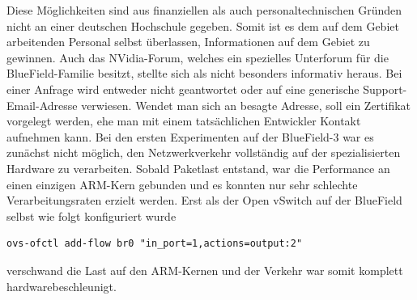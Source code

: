 Diese Möglichkeiten sind aus finanziellen als auch personaltechnischen Gründen nicht an einer deutschen Hochschule gegeben. Somit ist es dem auf dem Gebiet arbeitenden Personal selbst überlassen, Informationen auf dem Gebiet zu gewinnen. Auch das NVidia-Forum, welches ein spezielles Unterforum für die BlueField-Familie besitzt, stellte sich als nicht besonders informativ heraus. Bei einer Anfrage wird entweder nicht geantwortet oder auf eine generische Support-Email-Adresse verwiesen. Wendet man sich an besagte Adresse, soll ein Zertifikat vorgelegt werden, ehe man mit einem tatsächlichen Entwickler Kontakt aufnehmen kann.\newline
Bei den ersten Experimenten auf der BlueField-3 war es zunächst nicht möglich, den Netzwerkverkehr vollständig auf der spezialisierten Hardware zu verarbeiten. Sobald Paketlast entstand, war die Performance an einen einzigen ARM-Kern gebunden und es konnten nur sehr schlechte Verarbeitungsraten erzielt werden. Erst als der Open vSwitch auf der BlueField selbst wie folgt konfiguriert wurde
\begin{verbatim}
ovs-ofctl add-flow br0 "in_port=1,actions=output:2"
\end{verbatim}
verschwand die Last auf den ARM-Kernen und der Verkehr war somit komplett hardwarebeschleunigt.
